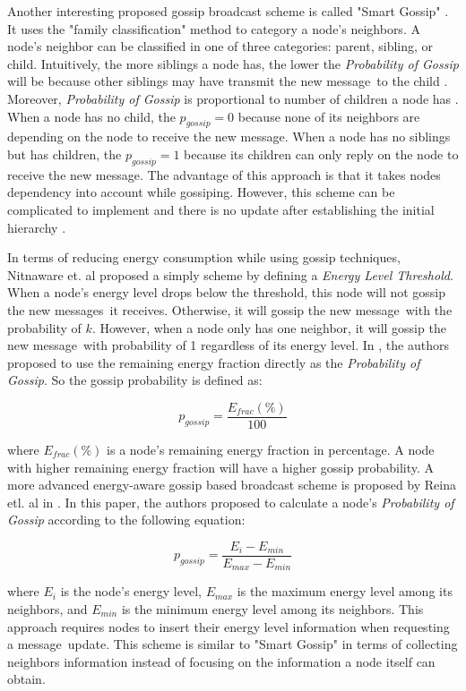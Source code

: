 \documentclass[onehalf,11pt]{beavtex}
\newcommand{\pog}{Probability of Gossip}
\newcommand{\msgs}{messages}
\newcommand{\msg}{message}
\begin{document}
Another interesting proposed gossip broadcast scheme is called "Smart Gossip" \cite{smart}. It uses the "family classification" method to category a node's neighbors. A node's neighbor can be classified in one of three categories: parent, sibling, or child. Intuitively, the more siblings a node has, the lower the \emph{\pog} will be because other siblings may have transmit the new \msg ~to the child \cite{2015survey}. Moreover, \emph{\pog} is proportional to number of children a node has \cite{2015survey}. When a node has no child, the $p_{gossip}=0$ because none of its neighbors are depending on the node to receive the new \msg. When a node has no siblings but has children, the $p_{gossip}=1$ because its children can only reply on the node to receive the new \msg. The advantage of this approach is that it takes nodes dependency into account while gossiping. However, this scheme can be complicated to implement and there is no update after establishing the initial hierarchy \cite{2015survey}.

In terms of reducing energy consumption while using gossip techniques, Nitnaware et. al \cite{nitnaware2009performance} proposed a simply scheme by defining a \emph{Energy Level Threshold}. When a node's energy level drops below the threshold, this node will not gossip the new \msgs ~it receives. Otherwise, it will gossip the new \msg ~with the probability of $k$. However, when a node only has one neighbor, it will gossip the new \msg ~with probability of 1 regardless of its energy level. In \cite{nitnaware2010energy}, the authors proposed to use the remaining energy fraction directly as the \emph{\pog}. So the gossip probability is defined as:

\[p_{gossip}=\frac{E_{frac}(\%)}{100}\] 

where $E_{frac}(\%)$ is a node's remaining energy fraction in percentage. A node with higher remaining energy fraction will have a higher gossip probability. A more advanced energy-aware gossip based broadcast scheme is proposed by Reina etl. al in \cite{reina2012optimization}. In this paper, the authors proposed to calculate a node's \emph{\pog} according to the following equation:

\[p_{gossip}=\frac{E_i - E_{min}}{E_{max}-E_{min}}\]

where $E_i$ is the node's energy level, $E_{max}$ is the maximum energy level among its neighbors, and $E_{min}$ is the minimum energy level among its neighbors. This approach requires nodes to insert their energy level information when requesting a \msg ~update. This scheme is similar to "Smart Gossip" in terms of collecting neighbors information instead of focusing on the information a node itself can obtain. 
\end{document}
